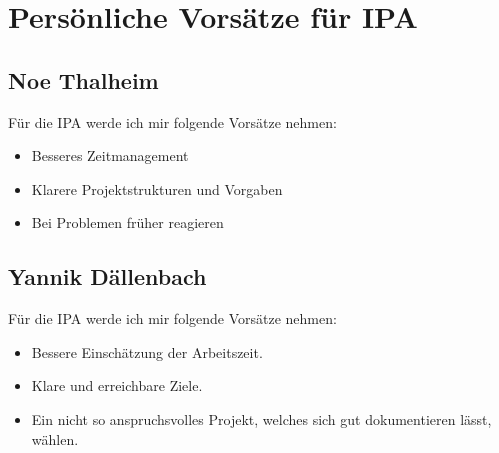 \section{Persönliche Vorsätze für IPA}

\subsection{Noe Thalheim}

Für die IPA werde ich mir folgende Vorsätze nehmen: \\
\begin{itemize}
    \item Besseres Zeitmanagement
    \item Klarere Projektstrukturen und Vorgaben
    \item Bei Problemen früher reagieren
\end{itemize}

\subsection{Yannik Dällenbach}
Für die IPA werde ich mir folgende Vorsätze nehmen:
\begin{itemize}
	\item Bessere Einschätzung der Arbeitszeit.
	\item Klare und erreichbare Ziele.
	\item Ein nicht so anspruchsvolles Projekt, welches sich gut dokumentieren lässt, wählen.
\end{itemize}

